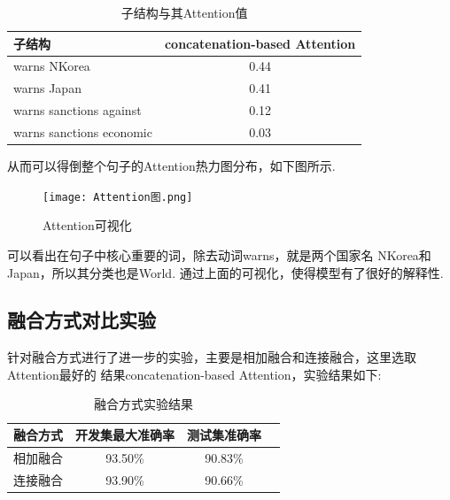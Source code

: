 \documentclass[bachelor,winfonts]{jnuthesis}
\begin{document}
\begin{table}[h!]
  \centering
  \begin{tabular}{lc}
    \toprule
    \textbf{子结构} & \textbf{concatenation-based Attention} \\
    \midrule
    warns NKorea & 0.44 \\ 
    warns Japan & 0.41 \\
    warns sanctions against & 0.12 \\
    warns sanctions economic & 0.03 \\
    \bottomrule
  \end{tabular}
  \caption{子结构与其Attention值}
\end{table}

从而可以得倒整个句子的Attention热力图分布，如下图所示.

\begin{figure}[h!]
  \centering
  \texttt{[image: Attention图.png]}
  \caption{Attention可视化}
\end{figure}

可以看出在句子中核心重要的词，除去动词warns，就是两个国家名
NKorea和Japan，所以其分类也是World.
通过上面的可视化，使得模型有了很好的解释性.

\subsection{融合方式对比实验}
针对融合方式进行了进一步的实验，主要是相加融合和连接融合，这里选取Attention最好的
结果concatenation-based Attention，实验结果如下:

\begin{table}[h!]
  \centering
  \begin{tabular}{cccc}
    \toprule
    \textbf{融合方式} & \textbf{开发集最大准确率} & \textbf{测试集准确率} \\
    \midrule
    相加融合 & 93.50\% & 90.83\% \\
    连接融合 & 93.90\% & 90.66\% \\
    \bottomrule
  \end{tabular}
  \caption{融合方式实验结果}
\end{table}
\end{document}
